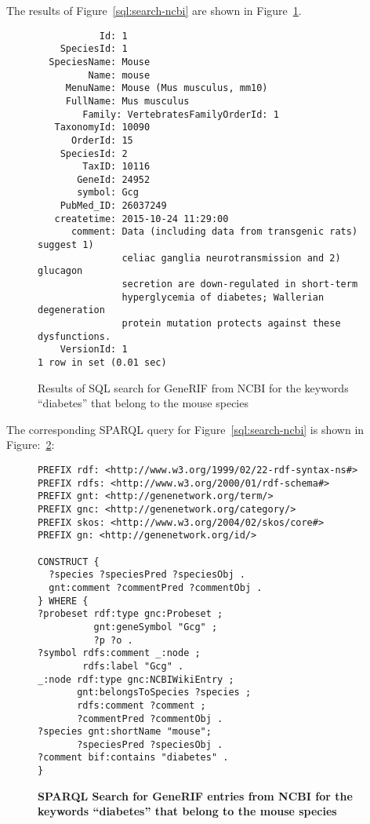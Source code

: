 The results of Figure~\ref{sql:search-ncbi} are shown in Figure~\ref{sql:ncbi-results}.

\begin{figure}[H]
\centering
\begin{verbatim}
           Id: 1
    SpeciesId: 1
  SpeciesName: Mouse
         Name: mouse
     MenuName: Mouse (Mus musculus, mm10)
     FullName: Mus musculus
        Family: VertebratesFamilyOrderId: 1
   TaxonomyId: 10090
      OrderId: 15
    SpeciesId: 2
        TaxID: 10116
       GeneId: 24952
       symbol: Gcg
    PubMed_ID: 26037249
   createtime: 2015-10-24 11:29:00
      comment: Data (including data from transgenic rats) suggest 1)
               celiac ganglia neurotransmission and 2) glucagon
               secretion are down-regulated in short-term
               hyperglycemia of diabetes; Wallerian degeneration
               protein mutation protects against these dysfunctions.
    VersionId: 1
1 row in set (0.01 sec)
\end{verbatim}
\caption[SQL Results: Search for GeneRIF entries from NCBI for the keyword ``diabetes'' that belongs to the mouse species]{Results of SQL search for GeneRIF from NCBI for the keywords ``diabetes'' that belong to the mouse species}\label{sql:ncbi-results}
\end{figure}

The corresponding SPARQL query for Figure~\ref{sql:search-ncbi} is shown in Figure:~\ref{sparql:ncbi-rif}:

\begin{figure}[H]
\centering
\begin{verbatim}
PREFIX rdf: <http://www.w3.org/1999/02/22-rdf-syntax-ns#>
PREFIX rdfs: <http://www.w3.org/2000/01/rdf-schema#>
PREFIX gnt: <http://genenetwork.org/term/>
PREFIX gnc: <http://genenetwork.org/category/>
PREFIX skos: <http://www.w3.org/2004/02/skos/core#>
PREFIX gn: <http://genenetwork.org/id/>

CONSTRUCT {
  ?species ?speciesPred ?speciesObj .
  gnt:comment ?commentPred ?commentObj .
} WHERE {
?probeset rdf:type gnc:Probeset ;
          gnt:geneSymbol "Gcg" ;
          ?p ?o .
?symbol rdfs:comment _:node ;
        rdfs:label "Gcg" .
_:node rdf:type gnc:NCBIWikiEntry ;
       gnt:belongsToSpecies ?species ;
       rdfs:comment ?comment ;
       ?commentPred ?commentObj .
?species gnt:shortName "mouse";
       ?speciesPred ?speciesObj .
?comment bif:contains "diabetes" .
}
\end{verbatim}
\caption[SPARQL: Search for GeneRIF entries from NCBI for the keyword ``diabetes'' that belongs to the mouse species]{\textbf{SPARQL Search for GeneRIF entries from NCBI for the keywords ``diabetes'' that belong to the mouse species}}\label{sparql:ncbi-rif}
\end{figure}

